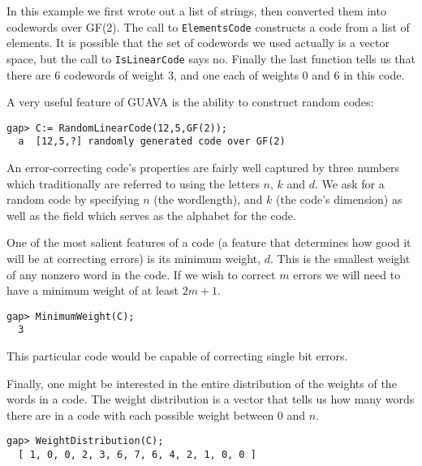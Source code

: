 \documentclass[a4paper,11pt]{report}
\begin{document}
{{ In this example we first wrote out a list of strings, then converted them into
codewords over GF(2). The call to \texttt{ElementsCode} constructs a code from a list of elements. It is possible that the set of
codewords we used actually is a vector space, but the call to \texttt{IsLinearCode} says no. Finally the last function tells us that there are 6 codewords of
weight 3, and one each of weights 0 and 6 in this code. 

 A very useful feature of \textsf{GUAVA} is the ability to construct random codes: 
\begin{Verbatim}[fontsize=\small,frame=single,label=Example]
  gap> C:= RandomLinearCode(12,5,GF(2));
  a  [12,5,?] randomly generated code over GF(2)
\end{Verbatim}
 

 An error-correcting code's properties are fairly well captured by three
numbers which traditionally are referred to using the letters $n$, $k$ and $d$. We ask for a random code by specifying $n$ (the wordlength), and $k$ (the code's dimension) as well as the field which serves as the alphabet for
the code. 

 One of the most salient features of a code (a feature that determines how good
it will be at correcting errors) is its minimum weight, $d$. This is the smallest weight of any nonzero word in the code. If we wish to
correct $m$ errors we will need to have a minimum weight of at least $2m+1$. 
\begin{Verbatim}[fontsize=\small,frame=single,label=Example]
  gap> MinimumWeight(C);
  3
\end{Verbatim}
 

 This particular code would be capable of correcting single bit errors. 

 Finally, one might be interested in the entire distribution of the weights of
the words in a code. The weight distribution is a vector that tells us how
many words there are in a code with each possible weight between $0$ and $n$. 
\begin{Verbatim}[fontsize=\small,frame=single,label=Example]
  gap> WeightDistribution(C);
  [ 1, 0, 0, 2, 3, 6, 7, 6, 4, 2, 1, 0, 0 ]
\end{Verbatim}
 }

 }

 
\end{document}
